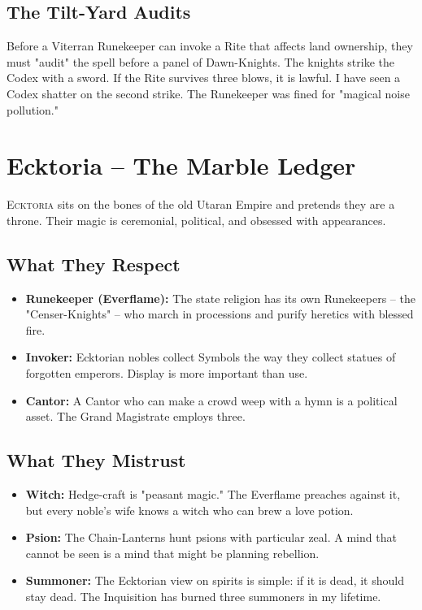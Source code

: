 \documentclass[10pt,a5paper]{book}
\begin{document}
\subsection*{The Tilt-Yard Audits}
Before a Viterran Runekeeper can invoke a Rite that affects land ownership, they must "audit" the spell before a panel of Dawn-Knights. The knights strike the Codex with a sword. If the Rite survives three blows, it is lawful. I have seen a Codex shatter on the second strike. The Runekeeper was fined for "magical noise pollution."

\section{Ecktoria -- The Marble Ledger}

\lettrine{E}{cktoria} sits on the bones of the old Utaran Empire and pretends they are a throne. Their magic is ceremonial, political, and obsessed with appearances.

\subsection*{What They Respect}
\begin{itemize}
    \item \textbf{Runekeeper (Everflame):} The state religion has its own Runekeepers -- the "Censer-Knights" -- who march in processions and purify heretics with blessed fire.
    \item \textbf{Invoker:} Ecktorian nobles collect Symbols the way they collect statues of forgotten emperors. Display is more important than use.
    \item \textbf{Cantor:} A Cantor who can make a crowd weep with a hymn is a political asset. The Grand Magistrate employs three.
\end{itemize}

\subsection*{What They Mistrust}
\begin{itemize}
    \item \textbf{Witch:} Hedge-craft is "peasant magic." The Everflame preaches against it, but every noble's wife knows a witch who can brew a love potion.
    \item \textbf{Psion:} The Chain-Lanterns hunt psions with particular zeal. A mind that cannot be seen is a mind that might be planning rebellion.
    \item \textbf{Summoner:} The Ecktorian view on spirits is simple: if it is dead, it should stay dead. The Inquisition has burned three summoners in my lifetime.
\end{itemize}
\end{document}
